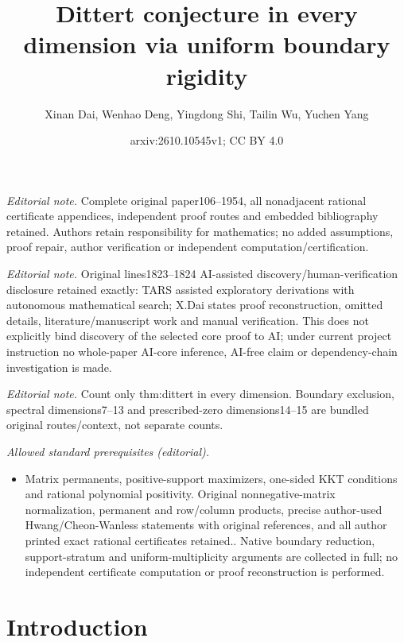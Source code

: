 \documentclass[10pt,a4paper]{amsart}
\title{Dittert conjecture in every dimension via uniform boundary rigidity}
\author{Xinan Dai, Wenhao Deng, Yingdong Shi, Tailin Wu, Yuchen Yang}
\date{arxiv:2610.10545v1; CC BY 4.0}
\theoremstyle{definition}
\theoremstyle{remark}
\begin{document}
\maketitle
\noindent\textit{Editorial note.} Complete original paper106--1954, all nonadjacent rational certificate appendices, independent proof routes and embedded bibliography retained. Authors retain responsibility for mathematics; no added assumptions, proof repair, author verification or independent computation/certification.\par\medskip
\noindent\textit{Editorial note.} Original lines1823--1824 AI-assisted discovery/human-verification disclosure retained exactly: TARS assisted exploratory derivations with autonomous mathematical search; X.Dai states proof reconstruction, omitted details, literature/manuscript work and manual verification. This does not explicitly bind discovery of the selected core proof to AI; under current project instruction no whole-paper AI-core inference, AI-free claim or dependency-chain investigation is made.\par\medskip
\noindent\textit{Editorial note.} Count only thm:dittert in every dimension. Boundary exclusion, spectral dimensions7--13 and prescribed-zero dimensions14--15 are bundled original routes/context, not separate counts.\par\medskip
\noindent\textit{Allowed standard prerequisites (editorial).}\begin{itemize}
\item Matrix permanents, positive-support maximizers, one-sided KKT conditions and rational polynomial positivity. Original nonnegative-matrix normalization, permanent and row/column products, precise author-used Hwang/Cheon-Wanless statements with original references, and all author printed exact rational certificates retained.. Native boundary reduction, support-stratum and uniform-multiplicity arguments are collected in full; no independent certificate computation or proof reconstruction is performed.
\end{itemize}\medskip
\section{Introduction}
\end{document}
